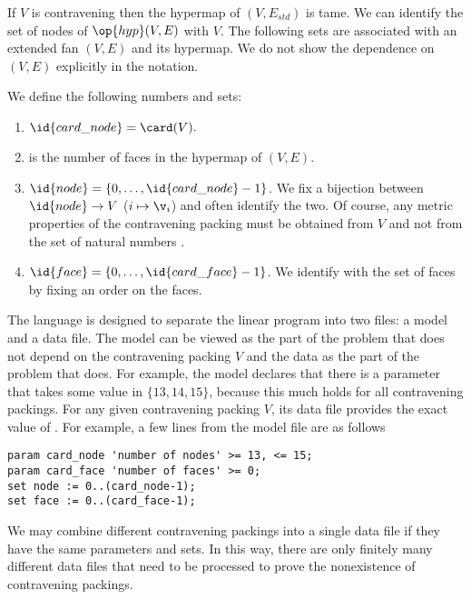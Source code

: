 If $V$ is contravening then the hypermap of $(V,E_{std})$ is tame.  We can
identify the set of nodes of $\op{hyp}(V,E)$ with $V$.  
The following sets are associated with an extended fan $(V,E)$ and its hypermap.  
We do not
show the dependence on $(V,E)$ explicitly in the notation.

\begin{definition}
We define the following numbers and sets:
\begin{enumerate}
\item $\id{card\_node} = \card(V).$
\item {} is the number of faces in the hypermap of $(V,E)$.
\item $\id{node} = \{ 0,\ldots, \id{card\_node}-1\}$.  We fix a bijection
between $\id{node}\to V$ ($i\mapsto \v_i$) 
and often identify the two.  Of course, any metric
properties of the contravening packing must be obtained from $V$ and not
from the set of natural numbers .
\item $\id{face}  = \{0,\ldots,\id{card\_face}-1\}$.  We identify  with
the set of faces by fixing an order on the faces.
\end{enumerate}
\end{definition}

\begin{remark}
The language   is designed to separate the linear program into
two files: a model and a
data file.  The model can be viewed as the part of the problem that does not depend
on the contravening packing $V$ and the data as the part of the problem that
does.  For example, the model declares that there is a parameter
  that takes some value in $\{13,14,15\}$, because this much
holds for all contravening packings.  For any given contravening
packing $V$, its data file provides the exact value of .
For example, a few lines from the model file are as follows
\begin{verbatim}
param card_node 'number of nodes' >= 13, <= 15; 
param card_face 'number of faces' >= 0; 
set node := 0..(card_node-1);
set face := 0..(card_face-1);
\end{verbatim}
\end{remark}

\begin{remark}[finiteness]
We may combine different contravening packings into a single data file if they
have the same parameters and sets.  In this way, there are only finitely many different
data files that need to be processed to prove the nonexistence of contravening
packings.
\end{remark}

